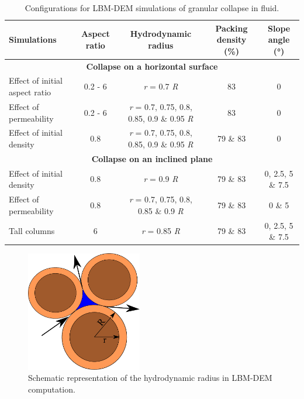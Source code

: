\begin{landscape}
\centering
\begin{table}
\centering
\caption{Configurations for LBM-DEM simulations of granular collapse in fluid.}
\label{table:lbm-dem-setup}
\begin{tabular}{lcccc}
\toprule
\textbf{Simulations} & \textbf{Aspect ratio} & \textbf{Hydrodynamic radius} & 
\textbf{Packing density (\%)} & \textbf{Slope angle (\si{\degree})}\\ \midrule
\multicolumn{5}{c}{\textbf{Collapse on a horizontal surface}} \\
Effect of initial aspect ratio & 0.2 - 6 & \textit{r} = 0.7 \textit{R} &  83 & 
0 \\
Effect of permeability & 0.2 - 6 & \textit{r} = 0.7, 0.75, 0.8, 0.85, 0.9 \& 
0.95 \textit{R} &  
83 & 0 \\
Effect of initial density & 0.8 & \textit{r} = 0.7, 0.75, 0.8, 0.85, 0.9 \& 
0.95 \textit{R} 
& 79 \& 83 & 0 \\ \midrule
\multicolumn{5}{c}{\textbf{Collapse on an inclined plane}} \\
Effect of initial density & 0.8 & \textit{r} = 0.9 \textit{R} & 79 \& 83 & 0, 
2.5, 5 \& 7.5 
\\
Effect of permeability & 0.8 & \textit{r} = 0.7, 0.75, 0.8, 0.85 \& 0.9 
\textit{R} &  79 \& 
83 & 0 \& 5 \\ \midrule
Tall columns & 6 & \textit{r} = 0.85 \textit{R} & 79 \& 83 & 0, 2.5, 5 \& 7.5 \\
\bottomrule
\end{tabular}
\end{table}
\end{landscape}

\begin{figure}[tbhp]
\centering
\includegraphics[width=0.45\textwidth]{reduction}
\caption{Schematic representation of the hydrodynamic radius in LBM-DEM 
computation.}
\label{fig:reduction}
\end{figure}

